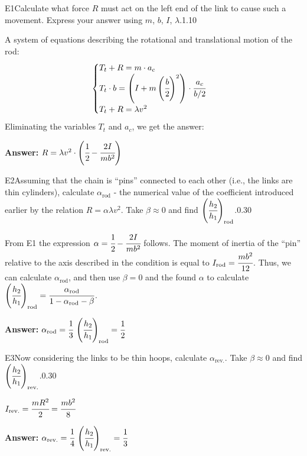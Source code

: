 \documentclass[11pt,a4paper]{article}
\begin{document}
\begin{solcard}{E1}{Calculate what force $R$ must act on the left end of the link to cause such a movement. Express your answer using $m$, $b$, $I$, $\lambda$.}{1.10}

A system of equations describing the rotational and translational motion of the rod: $$ \begin{cases} T_t+R = m \cdot a_c \\ T_t \cdot b = \left( I + m \left(\cfrac{b}{2}\right)^2 \right) \cdot \cfrac {a_c}{b/2} \\ T_t + R = \lambda v^2 \end{cases} $$ Eliminating the variables $T_t$ and $a_c$, we get the answer:

\par\smallskip\noindent\textbf{Answer:} $R = \lambda v^2 \cdot \left( \cfrac{1}{2} - \cfrac{2I}{mb^2} \right)$
\end{solcard}

\begin{solcard}{E2}{Assuming that the chain is “pins” connected to each other (i.e., the links are thin cylinders), calculate $\alpha_\text{rod}$ - the numerical value of the coefficient introduced earlier by the relation $R=\alpha \lambda v^2$. Take $\beta \approx 0$ and find $\left( \cfrac{h_2}{h_1} \right)_\text{rod}$.}{0.30}

From E1 the expression $\alpha = \cfrac{1}{2} - \cfrac{2I}{mb^2}$ follows. The moment of inertia of the “pin” relative to the axis described in the condition is equal to $I_\text{rod} = \cfrac{mb^2}{12}$. Thus, we can calculate $\alpha_\text{rod}$, and then use $\beta=0$ and the found $\alpha$ to calculate $\left(\cfrac{h_2}{h_1}\right)_\text{rod} = \cfrac{\alpha_\text{rod}}{1-\alpha_\text{rod}-\beta}$.

\par\smallskip\noindent\textbf{Answer:} $\alpha_\text{rod}=\cfrac{1}{3}$ $\left(\cfrac{h_2}{h_1}\right)_\text{rod} = \cfrac{1}{2}$
\end{solcard}

\begin{solcard}{E3}{Now considering the links to be thin hoops, calculate $\alpha_\text{rev.}$. Take $\beta \approx 0$ and find $\left( \cfrac{h_2}{h_1} \right)_\text{rev.}$.}{0.30}

$I_\text{rev.} = \cfrac{mR^2}{2} = \cfrac{mb^2}{8}$

\par\smallskip\noindent\textbf{Answer:} $\alpha_\text{rev.}=\cfrac{1}{4}$ $\left(\cfrac{h_2}{h_1}\right)_\text{rev.} = \cfrac{1}{3}$
\end{solcard}
\end{document}
